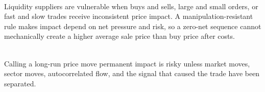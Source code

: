 \begin{principle} \\
Liquidity suppliers are vulnerable when buys and sells, large and small orders, or fast and slow trades receive inconsistent price impact. A manipulation-resistant rule makes impact depend on net pressure and risk, so a zero-net sequence cannot mechanically create a higher average sale price than buy price after costs.
\end{principle}

\begin{caveat} \\
Calling a long-run price move permanent impact is risky unless market moves, sector moves, autocorrelated flow, and the signal that caused the trade have been separated.
\end{caveat}
